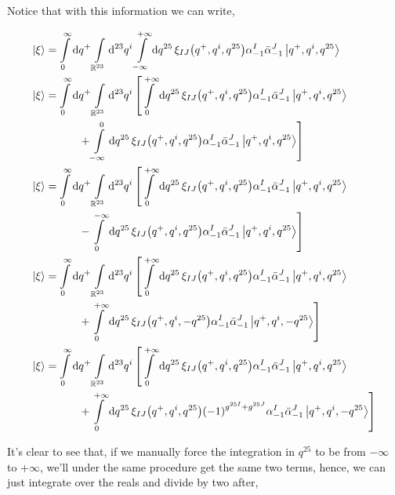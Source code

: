 Notice that with this information we can write,

\begin{align*}
    \ket{\xi}&=\int\limits_0^\infty\dd{q^+}\int\limits_{\mathbb R^{23}}\dd[23]{q^i}\int\limits_{-\infty}^{+\infty}\dd{q^{25}}\xi_{IJ}\qty(q^+,q^i,q^{25})\alpha^I_{-1}{\bar\alpha}^J_{-1}\ket{q^+,q^i,q^{25}}\\
    \ket{\xi}&=\int\limits_0^\infty\dd{q^+}\int\limits_{\mathbb R^{23}}\dd[23]{q^i}\left[\int\limits_{0}^{+\infty}\dd{q^{25}}\xi_{IJ}\qty(q^+,q^i,q^{25})\alpha^I_{-1}{\bar\alpha}^J_{-1}\ket{q^+,q^i,q^{25}}\right.\\
    &\quad\quad\quad\left.+\int\limits_{-\infty}^{0}\dd{q^{25}}\xi_{IJ}\qty(q^+,q^i,q^{25})\alpha^I_{-1}{\bar\alpha}^J_{-1}\ket{q^+,q^i,q^{25}}\right]\\
    \ket{\xi}&=\int\limits_0^\infty\dd{q^+}\int\limits_{\mathbb R^{23}}\dd[23]{q^i}\left[\int\limits_{0}^{+\infty}\dd{q^{25}}\xi_{IJ}\qty(q^+,q^i,q^{25})\alpha^I_{-1}{\bar\alpha}^J_{-1}\ket{q^+,q^i,q^{25}}\right.\\
    &\quad\quad\quad\left.-\int\limits_{0}^{-\infty}\dd{q^{25}}\xi_{IJ}\qty(q^+,q^i,q^{25})\alpha^I_{-1}{\bar\alpha}^J_{-1}\ket{q^+,q^i,q^{25}}\right]\\
    \ket{\xi}&=\int\limits_0^\infty\dd{q^+}\int\limits_{\mathbb R^{23}}\dd[23]{q^i}\left[\int\limits_{0}^{+\infty}\dd{q^{25}}\xi_{IJ}\qty(q^+,q^i,q^{25})\alpha^I_{-1}{\bar\alpha}^J_{-1}\ket{q^+,q^i,q^{25}}\right.\\
    &\quad\quad\quad\left.+\int\limits_{0}^{+\infty}\dd{q^{25}}\xi_{IJ}\qty(q^+,q^i,-q^{25})\alpha^I_{-1}{\bar\alpha}^J_{-1}\ket{q^+,q^i,-q^{25}}\right]\\
    \ket{\xi}&=\int\limits_0^\infty\dd{q^+}\int\limits_{\mathbb R^{23}}\dd[23]{q^i}\left[\int\limits_{0}^{+\infty}\dd{q^{25}}\xi_{IJ}\qty(q^+,q^i,q^{25})\alpha^I_{-1}{\bar\alpha}^J_{-1}\ket{q^+,q^i,q^{25}}\right.\\
    &\quad\quad\quad\left.+\int\limits_{0}^{+\infty}\dd{q^{25}}\xi_{IJ}\qty(q^+,q^i,q^{25})\qty(-1)^{g^{25I}+g^{25J}}\alpha^I_{-1}{\bar\alpha}^J_{-1}\ket{q^+,q^i,-q^{25}}\right]
\end{align*}

It's clear to see that, if we manually force the integration in $q^{25}$ to be from $-\infty$ to $+\infty$, we'll under the same procedure get 
the same two terms, hence, we can just integrate over the reals and divide by two after,

